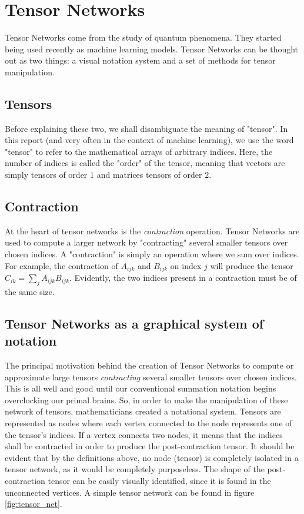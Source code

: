 \documentclass[11pt]{article}
\theoremstyle{definition}
\theoremstyle{definition}
\begin{document}
\section{Tensor Networks}
Tensor Networks come from the study of quantum phenomena. They 
started being used recently as machine learning models. Tensor Networks
can be thought out as two things: a visual notation system and a 
set of methods for tensor manipulation. 

\subsection{Tensors}
Before explaining these two, we shall 
disambiguate the meaning of "tensor". In this report (and very often in the context
of machine learning), we use the word "tensor" to refer to the mathematical arrays
of arbitrary indices. Here, the number of indices is called the "order" of the 
tensor, meaning that vectors are simply tensors of order $1$ and matrices tensors 
of order $2$. 

\subsection{Contraction}
At the heart of tensor networks is the {\it contraction} operation.
Tensor Networks are used to compute a larger network by "contracting" several
smaller tensors over chosen indices. A "contraction" is simply an operation 
where we sum over indices. For example, the contraction of $A_{ijk}$ and 
$B_{ijk}$ on index $j$ will produce the tensor $C_{ik} = \sum_{j} A_{ijk} B_{ijk}$.
Evidently, the two indices present in a contraction must be of the same size.

\subsection{Tensor Networks as a graphical system of notation}
The principal motivation behind the creation of Tensor Networks 
to compute or approximate large tensors {\it contracting} several
smaller tensors over chosen indices. This is all well and good until 
our conventional summation notation begins overclocking our primal brains.
So, in order to make the manipulation of these network of tensors, mathematicians
created a notational system. Tensors are represented as nodes where each 
vertex connected to the node represents one of the tensor's indices. 
If a vertex connects two nodes, it means that the indices shall be contracted 
in order to produce the post-contraction tensor. It should be evident that
by the definitions above, no node (tensor) is completely isolated in a tensor network,
as it would be completely purposeless. The shape of the post-contraction tensor 
can be easily visually identified, since it is found in the unconnected vertices.
A simple tensor network can be found in figure \ref{fig:tensor_net}.
\end{document}
